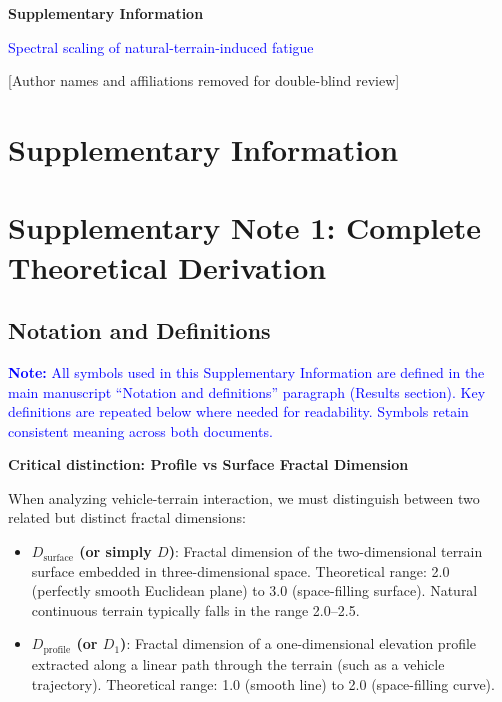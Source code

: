 \documentclass[11pt]{article}
\begin{document}
\begin{center}
{\Large\bfseries Supplementary Information}

\vspace{0.5cm}

{\large \textcolor{blue}{Spectral scaling of natural-terrain-induced fatigue}}

\vspace{0.5cm}

[Author names and affiliations removed for double-blind review]

\end{center}

\vspace{1cm}


\clearpage
\appendix

\section{Supplementary Information}

\section{Supplementary Note 1: Complete Theoretical Derivation}

\subsection{Notation and Definitions}

\textcolor{blue}{\textbf{Note:} All symbols used in this Supplementary Information are defined in the main manuscript ``Notation and definitions'' paragraph (Results section). Key definitions are repeated below where needed for readability. Symbols retain consistent meaning across both documents.}

\textbf{Critical distinction: Profile vs Surface Fractal Dimension}

When analyzing vehicle-terrain interaction, we must distinguish between two related but distinct fractal dimensions:

\begin{itemize}
\item \textbf{$D_{\text{surface}}$ (or simply $D$)}: Fractal dimension of the two-dimensional terrain surface embedded in three-dimensional space. Theoretical range: 2.0 (perfectly smooth Euclidean plane) to 3.0 (space-filling surface). Natural continuous terrain typically falls in the range 2.0--2.5.

\item \textbf{$D_{\text{profile}}$ (or $D_1$)}: Fractal dimension of a one-dimensional elevation profile extracted along a linear path through the terrain (such as a vehicle trajectory). Theoretical range: 1.0 (smooth line) to 2.0 (space-filling curve).
\end{itemize}
\end{document}
